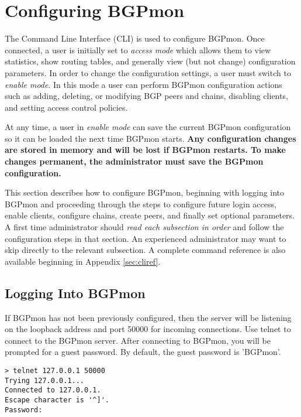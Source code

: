 \section{Configuring BGPmon}
\label{sec:cli}
The Command Line Interface (CLI) is used to configure BGPmon.
Once connected, a user is initially set to \emph{access mode} which allows them to view statistics, show routing tables, and generally view (but not change) configuration parameters.
In order to change the configuration settings,  a user must switch to \emph{enable mode}.
In this mode a user can perform BGPmon configuration actions such as adding, deleting, or modifying BGP peers and chains,  disabling clients, and setting access control policies.

At any time, a user in \emph{enable mode} can save the current BGPmon configuration so it can be loaded the next time BGPmon starts.
{\bf Any configuration changes are stored in memory and will be lost if BGPmon restarts.
To make changes permanent, the administrator must save the BGPmon configuration.}   


This section describes how to configure BGPmon, beginning with logging into BGPmon and proceeding through the steps to configure future login access,  enable clients, configure chains,  create peers, and finally set optional parameters.  A first time administrator should \emph{read each subsection in order} and follow the configuration steps in that section. An experienced administrator may want to skip directly to the relevant subsection.  A complete command reference is also available beginning in Appendix \ref{sec:cliref}.

\subsection{Logging Into BGPmon}
\label{sec:configure:login}

If BGPmon has not been previously configured, then the server will be listening on the loopback address and port 50000 for incoming connections.
Use telnet to connect to the BGPmon server.
After connecting to BGPmon,  you will be prompted for a guest password.
By default, the guest password is  'BGPmon'.

\begin{Verbatim}[frame=single]
> telnet 127.0.0.1 50000
Trying 127.0.0.1...
Connected to 127.0.0.1.
Escape character is '^]'.
Password:
\end{Verbatim}


